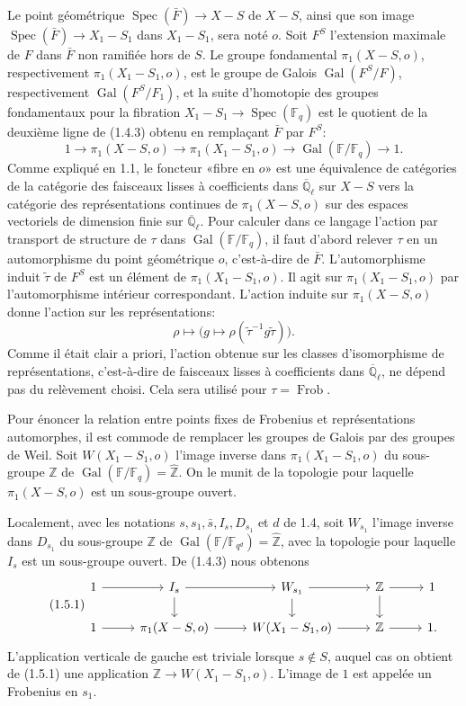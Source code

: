 \documentclass[10pt]{article}
\newcommand{\Fq}{\mathbb F_q}
\newcommand{\Fb}{\mathbb F}
\newcommand{\Ql}{\overline{\mathbb Q}_{\ell}}
\newcommand{\Zhat}{\widehat{\mathbb Z}}
\newcommand{\Gal}{\operatorname{Gal}}
\newcommand{\Spec}{\operatorname{Spec}}
\newcommand{\Frob}{\operatorname{Frob}}
\theoremstyle{deligne}
\newcommand{\heading}[1]{\vspace{0.7em}\noindent{\bfseries #1}\quad}
\begin{document}
Le point géométrique $\Spec(\bar F)\to X-S$ de $X-S$, ainsi que son image $\Spec(\bar F)\to X_1-S_1$ dans $X_1-S_1$, sera noté $o$. Soit $F^S$ l'extension maximale de $F$ dans $\bar F$ non ramifiée hors de $S$. Le groupe fondamental $\pi_1(X-S,o)$, respectivement $\pi_1(X_1-S_1,o)$, est le groupe de Galois $\Gal(F^S/F)$, respectivement $\Gal(F^S/F_1)$, et la suite d'homotopie des groupes fondamentaux pour la fibration $X_1-S_1\to\Spec(\Fq)$ est le quotient de la deuxième ligne de (1.4.3) obtenu en remplaçant $\bar F$ par $F^S$:
\begin{equation}\tag{1.4.4}
1\longrightarrow \pi_1(X-S,o)\longrightarrow \pi_1(X_1-S_1,o)
\longrightarrow\Gal(\Fb/\Fq)\longrightarrow1.
\end{equation}
Comme expliqué en 1.1, le foncteur «fibre en $o$» est une équivalence de catégories de la catégorie des faisceaux lisses à coefficients dans $\Ql$ sur $X-S$ vers la catégorie des représentations continues de $\pi_1(X-S,o)$ sur des espaces vectoriels de dimension finie sur $\Ql$. Pour calculer dans ce langage l'action par transport de structure de $\tau$ dans $\Gal(\Fb/\Fq)$, il faut d'abord relever $\tau$ en un automorphisme du point géométrique $o$, c'est-à-dire de $\bar F$. L'automorphisme induit $\tilde\tau$ de $F^S$ est un élément de $\pi_1(X_1-S_1,o)$. Il agit sur $\pi_1(X_1-S_1,o)$ par l'automorphisme intérieur correspondant. L'action induite sur $\pi_1(X-S,o)$ donne l'action sur les représentations:
\[
 \rho\longmapsto\bigl(g\longmapsto\rho(\tilde\tau^{-1}g\tilde\tau)\bigr).
\]
Comme il était clair a priori, l'action obtenue sur les classes d'isomorphisme de représentations, c'est-à-dire de faisceaux lisses à coefficients dans $\Ql$, ne dépend pas du relèvement choisi. Cela sera utilisé pour $\tau=\Frob$.

\heading{1.5.} Pour énoncer la relation entre points fixes de Frobenius et représentations automorphes, il est commode de remplacer les groupes de Galois par des groupes de Weil. Soit $W(X_1-S_1,o)$ l'image inverse dans $\pi_1(X_1-S_1,o)$ du sous-groupe $\mathbb Z$ de $\Gal(\Fb/\Fq)=\Zhat$. On le munit de la topologie pour laquelle $\pi_1(X-S,o)$ est un sous-groupe ouvert.

Localement, avec les notations $s,s_1,\bar s,I_s,D_{s_1}$ et $d$ de 1.4, soit $W_{s_1}$ l'image inverse dans $D_{s_1}$ du sous-groupe $\mathbb Z$ de $\Gal(\Fb/\mathbb F_{q^d})=\Zhat$, avec la topologie pour laquelle $I_s$ est un sous-groupe ouvert. De (1.4.3) nous obtenons
\begin{equation}\tag{1.5.1}
\begin{tikzcd}[column sep=2.6em,row sep=1.5em]
1 \arrow[r] & I_s \arrow[r] \arrow[d] & W_{s_1} \arrow[r] \arrow[d] & \mathbb Z \arrow[r] \arrow[d] & 1\\
1 \arrow[r] & \pi_1(X-S,o) \arrow[r] & W(X_1-S_1,o) \arrow[r] & \mathbb Z \arrow[r] & 1 .
\end{tikzcd}
\end{equation}
L'application verticale de gauche est triviale lorsque $s\notin S$, auquel cas on obtient de (1.5.1) une application $\mathbb Z\to W(X_1-S_1,o)$. L'image de $1$ est appelée un Frobenius en $s_1$.
\end{document}
